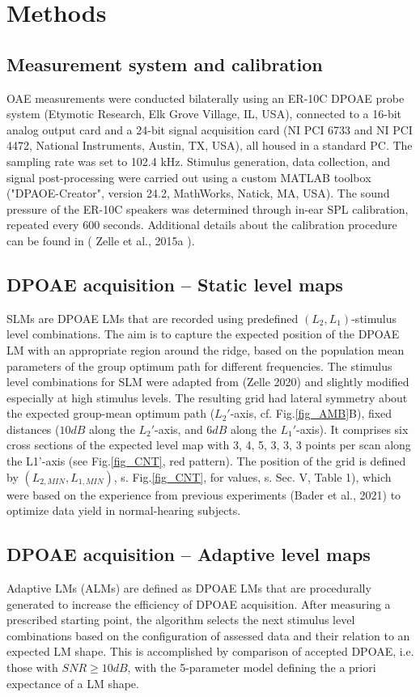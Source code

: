 \documentclass[journal,twoside,web]{ieeecolor2}
\begin{document}
\section{Methods}
\subsection{Measurement system and calibration}
OAE measurements were conducted bilaterally using an ER-10C DPOAE probe system (Etymotic Research, Elk Grove Village, IL, USA), connected to a 16-bit analog output card and a 24-bit signal acquisition card (NI PCI 6733 and NI PCI 4472, National Instruments, Austin, TX, USA), all housed in a standard PC.
The sampling rate was set to 102.4 kHz.
Stimulus generation, data collection, and signal post-processing were carried out using a custom MATLAB toolbox ("DPAOE-Creator", version 24.2, MathWorks, Natick, MA, USA).
The sound pressure of the ER-10C speakers was determined through in-ear SPL calibration, repeated every 600 seconds.
Additional details about the calibration procedure can be found in  ( Zelle et al., 2015a ).

\subsection{DPOAE acquisition – Static level maps}
SLMs are DPOAE LMs that are recorded using predefined $(L_2, L_1)$-stimulus level combinations.
The aim is to capture the expected position of the DPOAE LM with an appropriate region around the ridge, based on the population mean parameters of the group optimum path for different frequencies.
The stimulus level combinations for SLM were adapted from (Zelle 2020) and slightly modified especially at high stimulus levels.
The resulting grid had lateral symmetry about the expected group-mean optimum path ($L_2'$-axis, cf. Fig.\ref{fig_AMB}B), fixed distances ($10 dB$ along the $L_2'$-axis, and $6 dB$ along the $L_1'$-axis).
It comprises six cross sections of the expected level map with 3, 4, 5, 3, 3, 3 points per scan along the L1'-axis (see Fig.\ref{fig_CNT}, red pattern).
The position of the grid is defined by $(L_{2,MIN} , L_{1,MIN})$, s. Fig.\ref{fig_CNT}, for values,  s. Sec. V, Table 1), which were based on the experience from previous experiments (Bader et al., 2021) to optimize data yield in normal-hearing subjects.

\subsection{DPOAE acquisition – Adaptive level maps}
Adaptive LMs (ALMs) are defined as DPOAE LMs that are procedurally generated to increase the efficiency of DPOAE acquisition.
After measuring a prescribed starting point, the algorithm selects the next stimulus level combinations based on the configuration of assessed data and their relation to an expected LM shape.
   This is accomplished by comparison of accepted DPOAE, i.e.
those with $SNR \ge 10 dB$, with the 5-parameter model defining the a priori expectance of a LM shape.
\end{document}
